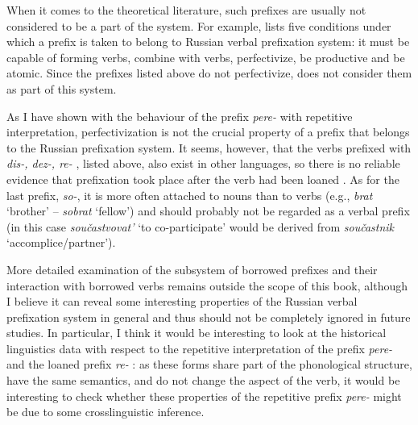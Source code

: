When it comes to the theoretical literature, such prefixes are usually not considered to be a part of the system. For example, \citet[101-105]{Krongauz:98} lists five conditions under which a prefix is taken to belong to Russian verbal prefixation  system: it must be capable of forming verbs, combine with verbs, perfectivize, be productive and be atomic. Since the prefixes listed above do not perfectivize, \citet[103]{Krongauz:98} does not consider them as part of this system.

As I have shown with the behaviour of the prefix \textit{pere-}   with repetitive  interpretation, perfectivization  is not the crucial property of a prefix that belongs to the Russian prefixation  system. It seems, however, that the verbs prefixed with \textit{dis-, dez-, re-}  , listed above, also exist in other languages, so there is no reliable evidence that prefixation  took place after the verb had been loaned  . As for the last prefix, \textit{so-}, it is more often attached to nouns than to verbs (e.g., \textit{brat} `brother' -- \textit{sobrat} `fellow') and should probably not be regarded as a verbal prefix (in this case \textit{sou\v{c}astvovat'} `to co-participate' would be derived from \textit{sou\v{c}astnik} `accomplice/partner'). 

More detailed examination of the subsystem of borrowed prefixes and their interaction with borrowed verbs remains outside the scope of this book, although I believe it can reveal some interesting properties of the Russian verbal prefixation  system in general and thus should not be completely ignored in future  studies. In particular, I think it would be interesting to look at the historical linguistics data with respect to the repetitive  interpretation of the prefix \textit{pere-}   and the loaned   prefix \textit{re-}  : as these forms share part of the phonological structure, have the same semantics, and do not change the aspect of the verb, it would be interesting to check whether these properties of the repetitive  prefix \textit{pere-}   might be due to some crosslinguistic inference. 


